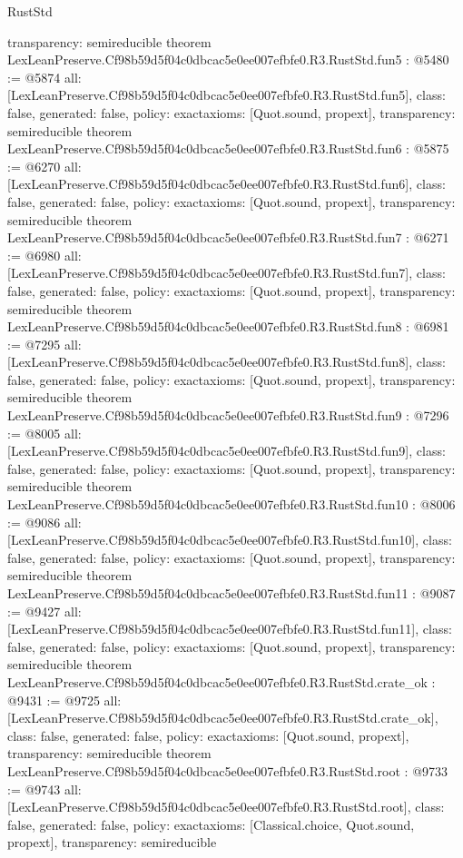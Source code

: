 \begin{lexlean}{RustStd}
\begin{coremodule}
{  transparency: semireducible
}
theorem LexLeanPreserve.Cf98b59d5f04c0dbcac5e0ee007efbfe0.R3.RustStd.fun5 : @5480 := @5874 {
  all: [LexLeanPreserve.Cf98b59d5f04c0dbcac5e0ee007efbfe0.R3.RustStd.fun5],
  class: false,
  generated: false,
  policy: exact{axioms: [Quot.sound, propext]},
  transparency: semireducible
}
theorem LexLeanPreserve.Cf98b59d5f04c0dbcac5e0ee007efbfe0.R3.RustStd.fun6 : @5875 := @6270 {
  all: [LexLeanPreserve.Cf98b59d5f04c0dbcac5e0ee007efbfe0.R3.RustStd.fun6],
  class: false,
  generated: false,
  policy: exact{axioms: [Quot.sound, propext]},
  transparency: semireducible
}
theorem LexLeanPreserve.Cf98b59d5f04c0dbcac5e0ee007efbfe0.R3.RustStd.fun7 : @6271 := @6980 {
  all: [LexLeanPreserve.Cf98b59d5f04c0dbcac5e0ee007efbfe0.R3.RustStd.fun7],
  class: false,
  generated: false,
  policy: exact{axioms: [Quot.sound, propext]},
  transparency: semireducible
}
theorem LexLeanPreserve.Cf98b59d5f04c0dbcac5e0ee007efbfe0.R3.RustStd.fun8 : @6981 := @7295 {
  all: [LexLeanPreserve.Cf98b59d5f04c0dbcac5e0ee007efbfe0.R3.RustStd.fun8],
  class: false,
  generated: false,
  policy: exact{axioms: [Quot.sound, propext]},
  transparency: semireducible
}
theorem LexLeanPreserve.Cf98b59d5f04c0dbcac5e0ee007efbfe0.R3.RustStd.fun9 : @7296 := @8005 {
  all: [LexLeanPreserve.Cf98b59d5f04c0dbcac5e0ee007efbfe0.R3.RustStd.fun9],
  class: false,
  generated: false,
  policy: exact{axioms: [Quot.sound, propext]},
  transparency: semireducible
}
theorem LexLeanPreserve.Cf98b59d5f04c0dbcac5e0ee007efbfe0.R3.RustStd.fun10 : @8006 := @9086 {
  all: [LexLeanPreserve.Cf98b59d5f04c0dbcac5e0ee007efbfe0.R3.RustStd.fun10],
  class: false,
  generated: false,
  policy: exact{axioms: [Quot.sound, propext]},
  transparency: semireducible
}
theorem LexLeanPreserve.Cf98b59d5f04c0dbcac5e0ee007efbfe0.R3.RustStd.fun11 : @9087 := @9427 {
  all: [LexLeanPreserve.Cf98b59d5f04c0dbcac5e0ee007efbfe0.R3.RustStd.fun11],
  class: false,
  generated: false,
  policy: exact{axioms: [Quot.sound, propext]},
  transparency: semireducible
}
theorem LexLeanPreserve.Cf98b59d5f04c0dbcac5e0ee007efbfe0.R3.RustStd.crate_ok : @9431 := @9725 {
  all: [LexLeanPreserve.Cf98b59d5f04c0dbcac5e0ee007efbfe0.R3.RustStd.crate_ok],
  class: false,
  generated: false,
  policy: exact{axioms: [Quot.sound, propext]},
  transparency: semireducible
}
theorem LexLeanPreserve.Cf98b59d5f04c0dbcac5e0ee007efbfe0.R3.RustStd.root : @9733 := @9743 {
  all: [LexLeanPreserve.Cf98b59d5f04c0dbcac5e0ee007efbfe0.R3.RustStd.root],
  class: false,
  generated: false,
  policy: exact{axioms: [Classical.choice, Quot.sound, propext]},
  transparency: semireducible
}


\end{coremodule}
\end{lexlean}
